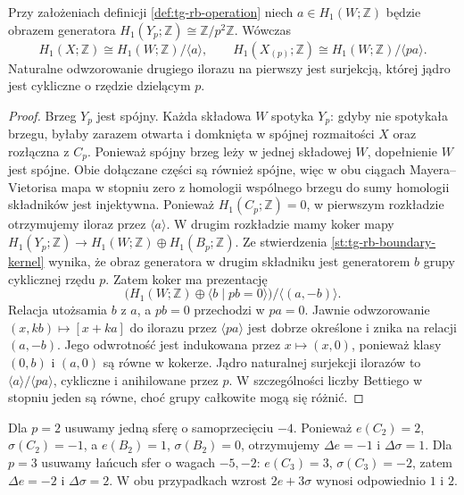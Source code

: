 \begin{stwierdzenie}
\label{prop:tg-rb-integral-h1}
Przy założeniach definicji \ref{def:tg-rb-operation}
niech $a\in H_1(W;\mathbb Z)$ będzie obrazem generatora
$H_1(Y_p;\mathbb Z)\cong\mathbb Z/p^2\mathbb Z$.
Wówczas
\[
H_1(X;\mathbb Z)\cong H_1(W;\mathbb Z)/\langle a\rangle,
\qquad
H_1(X_{(p)};\mathbb Z)\cong H_1(W;\mathbb Z)/\langle pa\rangle.
\]
Naturalne odwzorowanie drugiego ilorazu na pierwszy
jest surjekcją, której jądro jest cykliczne
o rzędzie dzielącym $p$.
\end{stwierdzenie}
\begin{proof}
Brzeg $Y_p$ jest spójny. Każda składowa $W$
spotyka $Y_p$: gdyby nie spotykała brzegu,
byłaby zarazem otwarta i domknięta w spójnej
rozmaitości $X$ oraz rozłączna z $C_p$.
Ponieważ spójny brzeg leży w jednej składowej
$W$, dopełnienie $W$ jest spójne. Obie
dołączane części są również spójne,
więc w obu ciągach Mayera--Vietorisa mapa
w stopniu zero z homologii wspólnego brzegu
do sumy homologii składników jest injektywna.
Ponieważ $H_1(C_p;\mathbb Z)=0$, w pierwszym
rozkładzie otrzymujemy iloraz przez $\langle a\rangle$.
W drugim rozkładzie mamy koker mapy
$H_1(Y_p;\mathbb Z)\to H_1(W;\mathbb Z)
\oplus H_1(B_p;\mathbb Z)$.
Ze stwierdzenia \ref{st:tg-rb-boundary-kernel}
wynika, że obraz generatora w drugim składniku jest
generatorem $b$ grupy cyklicznej rzędu $p$.
Zatem koker ma prezentację
\[
\bigl(H_1(W;\mathbb Z)\oplus\langle b\mid pb=0\rangle\bigr)
 /\langle(a,-b)\rangle .
\]
Relacja utożsamia $b$ z $a$, a $pb=0$
przechodzi w $pa=0$. Jawnie odwzorowanie
$(x,kb)\mapsto[x+ka]$ do ilorazu przez $\langle pa\rangle$
jest dobrze określone i znika na relacji $(a,-b)$.
Jego odwrotność jest indukowana przez
$x\mapsto(x,0)$, ponieważ klasy $(0,b)$
i $(a,0)$ są równe w kokerze.
Jądro naturalnej surjekcji ilorazów to
$\langle a\rangle/\langle pa\rangle$,
cykliczne i anihilowane przez $p$.
W szczególności liczby Bettiego w stopniu jeden
są równe, choć grupy całkowite mogą się różnić.
\end{proof}

\begin{przyklad}[Kontrola dla $p=2$ i $p=3$]
Dla $p=2$ usuwamy jedną sferę o samoprzecięciu
$-4$. Ponieważ $e(C_2)=2$, $\sigma(C_2)=-1$,
a $e(B_2)=1$, $\sigma(B_2)=0$, otrzymujemy
$\Delta e=-1$ i $\Delta\sigma=1$.
Dla $p=3$ usuwamy łańcuch sfer o wagach $-5,-2$:
$e(C_3)=3$, $\sigma(C_3)=-2$, zatem
$\Delta e=-2$ i $\Delta\sigma=2$.
W obu przypadkach wzrost $2e+3\sigma$ wynosi
odpowiednio $1$ i $2$.
\end{przyklad}

